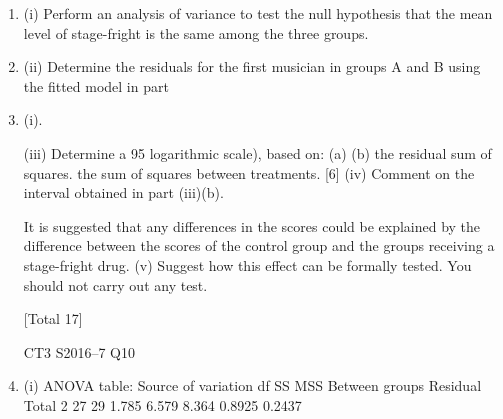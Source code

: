 \documentclass[a4paper,12pt]{article}
\begin{document}
\begin{enumerate}
[Total 21]10
A randomised clinical trial was conducted with the aim of investigating the
effectiveness of two drugs (A and B) for tackling stage-fright in musicians before a
performance. Ten musicians were allocated to each of two groups: group A (taking
drug A) and group B (taking drug B). A further 10 musicians were allocated to a third
group C, which served as a control group with the musicians not taking any drug. All
group allocations were random and the musicians did not know which treatment they
received.
At the end of the performance all 30 musicians were asked to give a score indicating
their stage-fright, on a scale 1–5, with a score of 1 implying “not nervous at all” and a
score of 5 implying “extremely nervous”. The scores were then transformed by
taking their logarithm (values denoted by y), and the results are shown below:
Group
A
B
C
∑y
0.693 1.099
0
1.099 0.693 0.693
0
1.099 1.099
0
0
0.693 0.693 1.386
0
0.693 1.099 0.693
0
1.099
0
1.609 1.099 1.386 1.099 1.609 0.693 1.099 1.609 1.386
6.475
6.356
11.589
For these data: SS T = 8.364, SS B = 1.785, SS R = 6.579 (as defined in page 26 of the
Formulae and Tables).
\item (i) Perform an analysis of variance to test the null hypothesis that the mean level
of stage-fright is the same among the three groups.

\item (ii) Determine the residuals for the first musician in groups A and B using the
fitted model in part \item (i).

(iii) Determine a 95%
logarithmic scale), based on:
(a)
(b)
the residual sum of squares.
the sum of squares between treatments.
[6]
(iv)
Comment on the interval obtained in part (iii)(b).

It is suggested that any differences in the scores could be explained by the difference
between the scores of the control group and the groups receiving a stage-fright drug.
(v)
Suggest how this effect can be formally tested. You should not carry out any
test.

[Total 17]

CT3 S2016–7
Q10
\item (i)
ANOVA table:
Source of variation df SS MSS
Between groups
Residual
Total 2
27
29 1.785
6.579
8.364 0.8925
0.2437


\end{enumerate}
\end{document}
